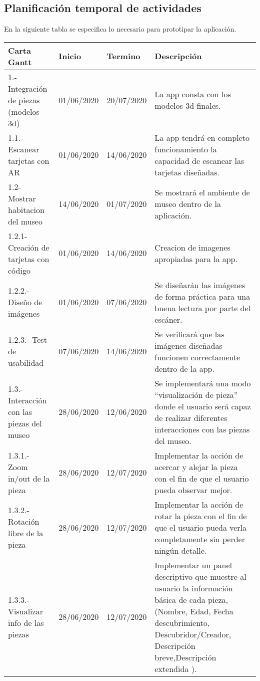 \subsection{Planificación temporal de actividades}

En la siguiente tabla se especifica lo necesario para prototipar la aplicación.

\begin{longtable}{| p{}| p{}| p{}| p{}|}
\hline 
	Carta Gantt & 
	Inicio & 
	Termino	& 
	Descripción
\\ 
\hline 
	1.- Integración de piezas (modelos 3d) &
	01/06/2020 &
	20/07/2020 & 
	La app consta con los modelos 3d finales.
\\ 
\hline 
	1.1.- Escanear tarjetas con AR &
 	01/06/2020 & 
 	14/06/2020 & 
	La app tendrá en completo funcionamiento la capacidad de escanear las tarjetas diseñadas.
\\ 
\hline 
	1.2-  Mostrar habitacion del museo &
	14/06/2020 &
	01/07/2020 & 
	Se mostrará el ambiente de museo dentro de la aplicación.
	\\ 
\hline 
	1.2.1- Creación de tarjetas con código &
	01/06/2020 &
	14/06/2020 & 
	Creacion de imagenes apropiadas para la app.
	\\
\hline 
	1.2.2.- Diseño de imágenes &
	01/06/2020 &
	07/06/2020 &
	Se diseñarán las imágenes de forma práctica para una buena lectura por parte del escáner.
\\
\hline 
	1.2.3.- Test de usabilidad &
	07/06/2020 &
	14/06/2020 & 
	Se verificará que las imágenes diseñadas funcionen correctamente dentro de la app.
\\ 
\hline 
	1.3.- Interacción con las piezas del museo &
	28/06/2020 &
	12/06/2020 & 
	Se implementará una modo “visualización de pieza” donde el usuario será capaz de realizar diferentes interacciones con las piezas del museo.
\\
\hline 
	1.3.1.- Zoom in/out de la pieza &
	28/06/2020 &
	12/07/2020 & 
	Implementar la acción de acercar y alejar la pieza con el fin de que el usuario pueda observar mejor.
\\
\hline 
	1.3.2.- Rotación libre de la pieza &
	28/06/2020 &
	12/07/2020 & 
	Implementar la acción de rotar la pieza con el fin de que el usuario pueda verla completamente sin perder ningún detalle.
	\\
\hline 
	1.3.3.- Visualizar info de las piezas &
	28/06/2020 &
	12/07/2020 &
	Implementar un panel descriptivo que muestre al usuario la información básica de cada pieza, (Nombre, Edad, Fecha descubrimiento, Descubridor/Creador, Descripción breve,Descripción extendida ).

\end{longtable}
